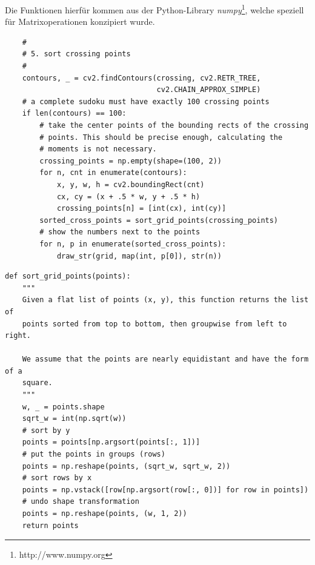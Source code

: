 Die Funktionen hierfür kommen aus der Python-Library \emph{numpy}\footnote{http://www.numpy.org}, welche speziell für Matrixoperationen konzipiert wurde.

\begin{lstlisting}
    #
    # 5. sort crossing points
    #
    contours, _ = cv2.findContours(crossing, cv2.RETR_TREE,
                                   cv2.CHAIN_APPROX_SIMPLE)
    # a complete sudoku must have exactly 100 crossing points
    if len(contours) == 100:
        # take the center points of the bounding rects of the crossing
        # points. This should be precise enough, calculating the
        # moments is not necessary.
        crossing_points = np.empty(shape=(100, 2))
        for n, cnt in enumerate(contours):
            x, y, w, h = cv2.boundingRect(cnt)
            cx, cy = (x + .5 * w, y + .5 * h)
            crossing_points[n] = [int(cx), int(cy)]
        sorted_cross_points = sort_grid_points(crossing_points)
        # show the numbers next to the points
        for n, p in enumerate(sorted_cross_points):
            draw_str(grid, map(int, p[0]), str(n))
\end{lstlisting}

\begin{lstlisting}
def sort_grid_points(points):
    """
    Given a flat list of points (x, y), this function returns the list of
    points sorted from top to bottom, then groupwise from left to right.

    We assume that the points are nearly equidistant and have the form of a
    square.
    """
    w, _ = points.shape
    sqrt_w = int(np.sqrt(w))
    # sort by y
    points = points[np.argsort(points[:, 1])]
    # put the points in groups (rows)
    points = np.reshape(points, (sqrt_w, sqrt_w, 2))
    # sort rows by x
    points = np.vstack([row[np.argsort(row[:, 0])] for row in points])
    # undo shape transformation
    points = np.reshape(points, (w, 1, 2))
    return points
\end{lstlisting}

